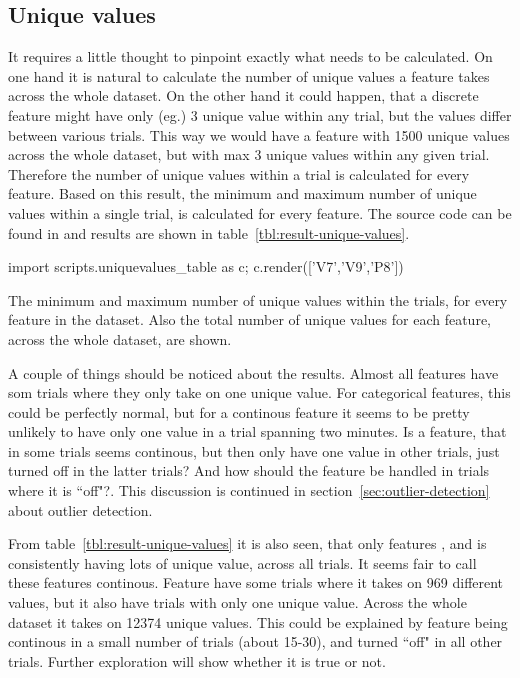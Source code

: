 \subsection{Unique values}\label{sec:unique-values}
It requires a little thought to pinpoint exactly what needs to be calculated. On one hand it is natural to calculate the number of unique values a feature takes across the whole dataset. On the other hand it could happen, that a discrete feature might have only (eg.) 3 unique value within any trial, but the values differ between various trials. This way we would have a feature with 1500 unique values across the whole dataset, but with max 3 unique values within any given trial. Therefore the number of unique values within a trial is calculated for every feature. Based on this result, the minimum and maximum number of unique values within a single trial, is calculated for every feature. The source code can be found in  and results are shown in table~\ref{tbl:result-unique-values}.\par
\begin{table}
    {\small\sffamily
        \begin{python}
            import scripts.uniquevalues_table as c; c.render(['V7','V9','P8'])
        \end{python}
    }
    \caption{The minimum and maximum number of unique values within the trials, for every feature in the dataset. Also the total number of unique values for each feature, across the whole dataset, are shown.}
    \label{tbl:result-unique-values}
\end{table}
A couple of things should be noticed about the results. Almost all features have som trials where they only take on one unique value. For categorical features, this could be perfectly normal, but for a continous feature it seems to be pretty unlikely to have only one value in a trial spanning two minutes. Is a feature, that in some trials seems continous, but then only have one value in other trials, just turned off in the latter trials? And how should the feature be handled in trials where it is ``off"?. This discussion is continued in section~\ref{sec:outlier-detection} about outlier detection. \par

From table~\ref{tbl:result-unique-values} it is also seen, that only features ,  and  is consistently having lots of unique value, across all trials. It seems fair to call these features continous. Feature  have some trials where it takes on 969 different values, but it also have trials with only one unique value. Across the whole dataset it takes on 12374 unique values. This could be explained by feature  being continous in a small number of trials (about 15-30), and turned ``off" in all other trials. Further exploration will show whether it is true or not. \par

